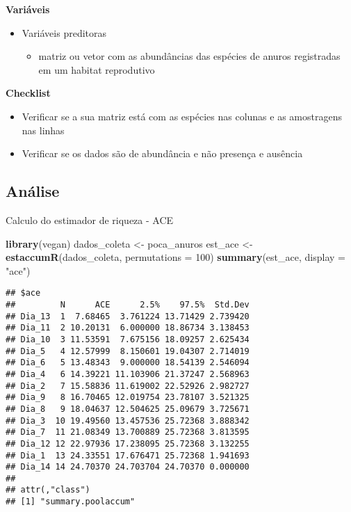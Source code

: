\documentclass[
]{book}
\newenvironment{Shaded}{\begin{snugshade}}{\end{snugshade}}
\newcommand{\DataTypeTok}[1]{\textcolor[rgb]{0.13,0.29,0.53}{#1}}
\newcommand{\DecValTok}[1]{\textcolor[rgb]{0.00,0.00,0.81}{#1}}
\newcommand{\KeywordTok}[1]{\textcolor[rgb]{0.13,0.29,0.53}{\textbf{#1}}}
\newcommand{\NormalTok}[1]{#1}
\newcommand{\StringTok}[1]{\textcolor[rgb]{0.31,0.60,0.02}{#1}}
\providecommand{\tightlist}{%
  \setlength{\itemsep}{0pt}\setlength{\parskip}{0pt}}
\begin{document}
\textbf{Variáveis}

\begin{itemize}
\tightlist
\item
  Variáveis preditoras

  \begin{itemize}
  \tightlist
  \item
    matriz ou vetor com as abundâncias das espécies de anuros registradas em um habitat reprodutivo
  \end{itemize}
\end{itemize}

\textbf{Checklist}

\begin{itemize}
\tightlist
\item
  Verificar se a sua matriz está com as espécies nas colunas e as amostragens nas linhas
\item
  Verificar se os dados são de abundância e não presença e ausência
\end{itemize}

\hypertarget{anuxe1lise-1}{%
\subsection{Análise}\label{anuxe1lise-1}}

Calculo do estimador de riqueza - ACE

\begin{Shaded}
\begin{Highlighting}[]
\KeywordTok{library}\NormalTok{(vegan)}
\NormalTok{dados_coleta <-}\StringTok{ }\NormalTok{poca_anuros}
\NormalTok{est_ace <-}\StringTok{ }\KeywordTok{estaccumR}\NormalTok{(dados_coleta, }\DataTypeTok{permutations =} \DecValTok{100}\NormalTok{)}
\KeywordTok{summary}\NormalTok{(est_ace, }\DataTypeTok{display =} \StringTok{"ace"}\NormalTok{)}
\end{Highlighting}
\end{Shaded}

\begin{verbatim}
## $ace
##         N      ACE      2.5%    97.5%  Std.Dev
## Dia_13  1  7.68465  3.761224 13.71429 2.739420
## Dia_11  2 10.20131  6.000000 18.86734 3.138453
## Dia_10  3 11.53591  7.675156 18.09257 2.625434
## Dia_5   4 12.57999  8.150601 19.04307 2.714019
## Dia_6   5 13.48343  9.000000 18.54139 2.546094
## Dia_4   6 14.39221 11.103906 21.37247 2.568963
## Dia_2   7 15.58836 11.619002 22.52926 2.982727
## Dia_9   8 16.70465 12.019754 23.78107 3.521325
## Dia_8   9 18.04637 12.504625 25.09679 3.725671
## Dia_3  10 19.49560 13.457536 25.72368 3.888342
## Dia_7  11 21.08349 13.700889 25.72368 3.813595
## Dia_12 12 22.97936 17.238095 25.72368 3.132255
## Dia_1  13 24.33551 17.676471 25.72368 1.941693
## Dia_14 14 24.70370 24.703704 24.70370 0.000000
## 
## attr(,"class")
## [1] "summary.poolaccum"
\end{verbatim}
\end{document}
